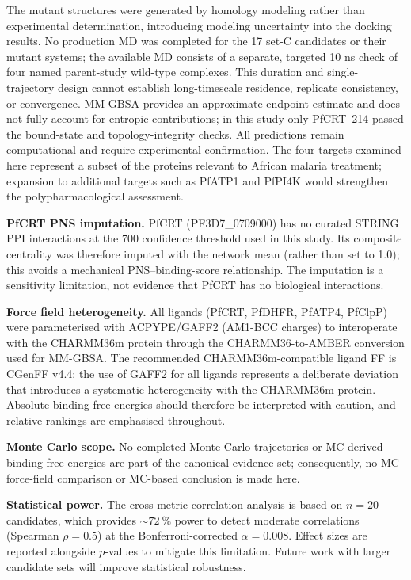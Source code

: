 \documentclass[11pt,a4paper]{article}
\begin{document}
The mutant structures were generated by homology modeling rather than experimental determination, introducing modeling uncertainty into the docking results. No production MD was completed for the 17 set-C candidates or their mutant systems; the available MD consists of a separate, targeted 10 ns check of four named parent-study wild-type complexes. This duration and single-trajectory design cannot establish long-timescale residence, replicate consistency, or convergence. MM-GBSA provides an approximate endpoint estimate and does not fully account for entropic contributions; in this study only PfCRT--214 passed the bound-state and topology-integrity checks. All predictions remain computational and require experimental confirmation. The four targets examined here represent a subset of the proteins relevant to African malaria treatment; expansion to additional targets such as PfATP1 and PfPI4K would strengthen the polypharmacological assessment.

\textbf{PfCRT PNS imputation.}
PfCRT (PF3D7\_0709000) has no curated STRING PPI interactions at the 700 confidence threshold used in this study. Its composite centrality was therefore imputed with the network mean (rather than set to 1.0); this avoids a mechanical PNS--binding-score relationship. The imputation is a sensitivity limitation, not evidence that PfCRT has no biological interactions.

\textbf{Force field heterogeneity.}
All ligands (PfCRT, PfDHFR, PfATP4, PfClpP) were parameterised with ACPYPE/GAFF2 (AM1-BCC charges) to interoperate with the CHARMM36m protein through the CHARMM36-to-AMBER conversion used for MM-GBSA. The recommended CHARMM36m-compatible ligand FF is CGenFF v4.4; the use of GAFF2 for all ligands represents a deliberate deviation that introduces a systematic heterogeneity with the CHARMM36m protein. Absolute binding free energies should therefore be interpreted with caution, and relative rankings are emphasised throughout.

\textbf{Monte Carlo scope.}
No completed Monte Carlo trajectories or MC-derived binding free energies are part of the canonical evidence set; consequently, no MC force-field comparison or MC-based conclusion is made here.

\textbf{Statistical power.}
The cross-metric correlation analysis is based on $n = 20$ candidates, which provides $\sim \qty{72}{\percent}$ power to detect moderate correlations (Spearman $\rho = 0.5$) at the Bonferroni-corrected $\alpha = 0.008$. Effect sizes are reported alongside $p$-values to mitigate this limitation. Future work with larger candidate sets will improve statistical robustness.
\end{document}
